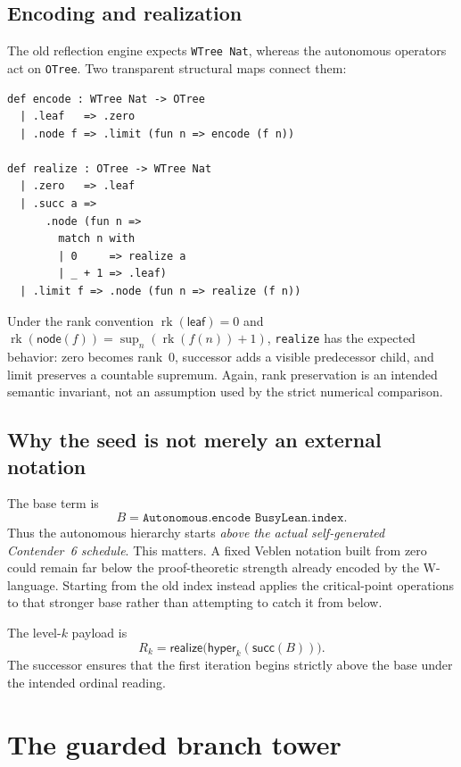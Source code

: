 \documentclass[11pt]{article}
\theoremstyle{definition}
\theoremstyle{remark}
\newcommand{\lean}[1]{\texttt{#1}}
\begin{document}
\subsection{Encoding and realization}

The old reflection engine expects \lean{WTree Nat}, whereas the autonomous
operators act on \lean{OTree}.  Two transparent structural maps connect them:
\begin{lstlisting}
def encode : WTree Nat -> OTree
  | .leaf   => .zero
  | .node f => .limit (fun n => encode (f n))

def realize : OTree -> WTree Nat
  | .zero   => .leaf
  | .succ a =>
      .node (fun n =>
        match n with
        | 0     => realize a
        | _ + 1 => .leaf)
  | .limit f => .node (fun n => realize (f n))
\end{lstlisting}

Under the rank convention
$\operatorname{rk}(\mathsf{leaf})=0$ and
$\operatorname{rk}(\mathsf{node}(f))=\sup_n(\operatorname{rk}(f(n))+1)$,
\lean{realize} has the expected behavior: zero becomes rank~0, successor adds a
visible predecessor child, and limit preserves a countable supremum.  Again,
rank preservation is an intended semantic invariant, not an assumption used by
the strict numerical comparison.

\subsection{Why the seed is not merely an external notation}

The base term is
\[
  B=\lean{Autonomous.encode BusyLean.index}.
\]
Thus the autonomous hierarchy starts \emph{above the actual self-generated
Contender~6 schedule}.  This matters.  A fixed Veblen notation built from zero
could remain far below the proof-theoretic strength already encoded by the
W-language.  Starting from the old index instead applies the critical-point
operations to that stronger base rather than attempting to catch it from below.

The level-$k$ payload is
\[
  R_k=\mathsf{realize}\bigl(\mathsf{hyper}_k(\mathsf{succ}(B))\bigr).
\]
The successor ensures that the first iteration begins strictly above the base
under the intended ordinal reading.

\section{The guarded branch tower}
\end{document}

